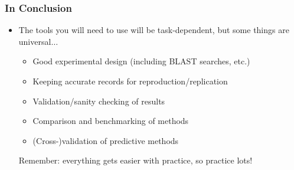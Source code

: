 \documentclass[table]{beamer}
\begin{document}
\begin{frame}[fragile]
  \frametitle{In Conclusion}
  \begin{itemize}
    \item The tools you will need to use will be task-dependent, but some things are universal$\ldots$
    \begin{itemize}
      \item Good experimental design (including BLAST searches, etc.)
      \item Keeping accurate records for reproduction/replication
      \item Validation/sanity checking of results
      \item Comparison and benchmarking of methods
      \item (Cross-)validation of predictive methods
    \end{itemize}
     Remember: everything gets easier with practice, so practice lots!   
  \end{itemize}
\end{frame}


%
%
\end{document}
